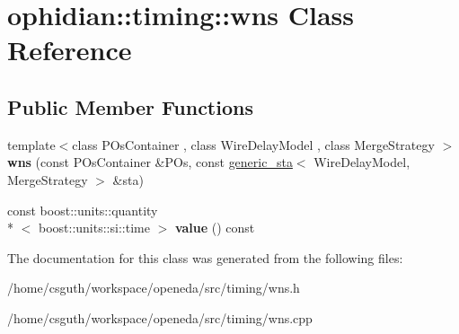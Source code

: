 \hypertarget{classophidian_1_1timing_1_1wns}{\section{ophidian\-:\-:timing\-:\-:wns Class Reference}
\label{classophidian_1_1timing_1_1wns}
}
\subsection*{Public Member Functions}
\begin{DoxyCompactItemize}
\item 
\hypertarget{classophidian_1_1timing_1_1wns_ab74cdcdfb966818119ba6ed8579eb9ed}{{\footnotesize template$<$class P\-Os\-Container , class Wire\-Delay\-Model , class Merge\-Strategy $>$ }\\{\bfseries wns} (const P\-Os\-Container \&P\-Os, const \hyperlink{classophidian_1_1timing_1_1generic__sta}{generic\-\_\-sta}$<$ Wire\-Delay\-Model, Merge\-Strategy $>$ \&sta)}\label{classophidian_1_1timing_1_1wns_ab74cdcdfb966818119ba6ed8579eb9ed}

\item 
\hypertarget{classophidian_1_1timing_1_1wns_a87065c5167909c9f9d7c954e3ab4be9b}{const boost\-::units\-::quantity\\*
$<$ boost\-::units\-::si\-::time $>$ {\bfseries value} () const }\label{classophidian_1_1timing_1_1wns_a87065c5167909c9f9d7c954e3ab4be9b}

\end{DoxyCompactItemize}


The documentation for this class was generated from the following files\-:\begin{DoxyCompactItemize}
\item 
/home/csguth/workspace/openeda/src/timing/wns.\-h\item 
/home/csguth/workspace/openeda/src/timing/wns.\-cpp\end{DoxyCompactItemize}
